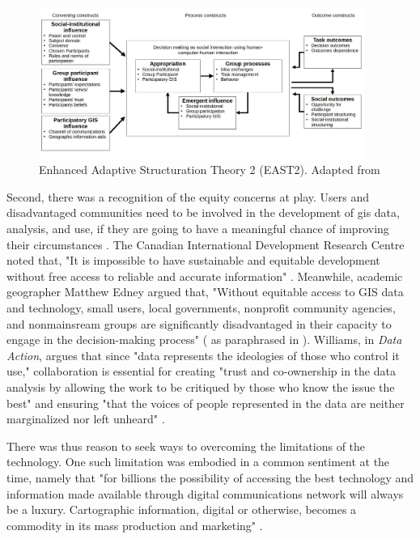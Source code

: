 \begin{figure}[!htb]
	\centering
	\includegraphics[width=0.95\textwidth]{Figures/chap2/east2.jpg}
	\caption[Enhanced Adaptive Structuration Theory 2]{Enhanced Adaptive Structuration Theory 2 (EAST2). Adapted from \cite{jankowskiGISGroupDecision2001}}
	\label{fig:east2}
\end{figure}

Second, there was a recognition of the equity concerns at play. Users and disadvantaged communities need to be involved in the development of \ac{gis} data, analysis, and use, if they are going to have a meaningful chance of improving their circumstances \cite{talenBottomUpGIS2000}. The Canadian International Development Research Centre noted that, "It is impossible to have sustainable and equitable development without free access to reliable and accurate information" \cite{benmouffokInformationDecisionMaking1993}. Meanwhile, academic geographer Matthew Edney argued that, "Without equitable access to GIS data and technology, small users, local governments, nonprofit community agencies, and nonmainsream groups are significantly disadvantaged in their capacity to engage in the decision-making process" (\cite{edney1991strategies} as paraphrased in \cite{harrisPursuingSocialGoals1994}). Williams, in \textit{Data Action}, argues that since "data represents the ideologies of those who control it use," collaboration is essential for creating "trust and co-ownership in the data analysis by allowing the work to be critiqued by those who know the issue the best" and ensuring "that the voices of people represented in the data are neither marginalized nor left unheard" \cite{williamsDataActionUsing2020}.

There was thus reason to seek ways to overcoming the limitations of the technology. One such limitation was embodied in a common sentiment at the time, namely that "for billions the possibility of accessing the best technology and information made available through digital communications network will always be a luxury. Cartographic information, digital or otherwise, becomes a commodity in its mass production and marketing" \cite{mchaffieManufacturingMetaphors1994}. 

